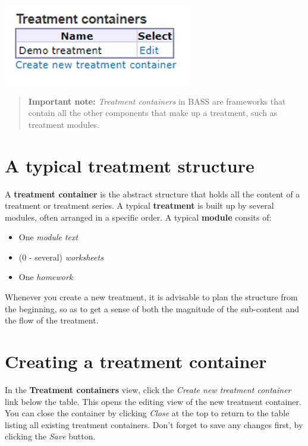 \documentclass[]{book}
\providecommand{\tightlist}{%
  \setlength{\itemsep}{0pt}\setlength{\parskip}{0pt}}
\begin{document}
\includegraphics{images/new-images/treatmentContainers.png}

\begin{quote}
\textbf{Important note:} \emph{Treatment containers} in BASS are frameworks that contain all the other components that make up a treatment, such as treatment modules.
\end{quote}

\hypertarget{a-typical-treatment-structure}{%
\section{A typical treatment structure}\label{a-typical-treatment-structure}}

A \textbf{treatment container} is the abstract structure that holds all the content of a treatment or treatment series. A typical \textbf{treatment} is built up by several modules, often arranged in a specific order. A typical \textbf{module} consits of:

\begin{itemize}
\tightlist
\item
  One \emph{module text}
\item
  (0 - several) \emph{worksheets}
\item
  One \emph{homework}
\end{itemize}

Whenever you create a new treatment, it is advisable to plan the structure from the beginning, so as to get a sense of both the magnitude of the sub-content and the flow of the treatment.

\hypertarget{creating-a-treatment-container}{%
\section{Creating a treatment container}\label{creating-a-treatment-container}}

In the \textbf{Treatment containers} view, click the \emph{Create new treatment container} link below the table. This opens the editing view of the new treatment container. You can close the container by clicking \emph{Close} at the top to return to the table listing all existing treatment containers. Don't forget to save any changes first, by clicking the \emph{Save} button.
\end{document}
